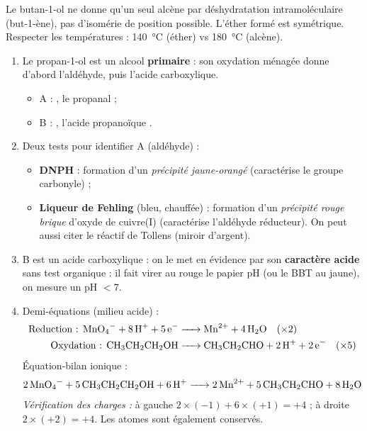 \documentclass[11pt]{article}
\newcommand{\cle}[1]{{\popxbold\color{popdark}#1}}
\begin{document}
\begin{attention}
Le butan-1-ol ne donne qu'un seul alcène par déshydratation intramoléculaire (but-1-ène), pas d'isomérie de position possible. L'éther formé est symétrique. Respecter les températures : \SI{140}{\celsius} (éther) vs \SI{180}{\celsius} (alcène).
\end{attention}

\begin{corrige}
\begin{enumerate}
  \item Le propan-1-ol est un alcool \textbf{primaire} : son oxydation ménagée donne d'abord l'aldéhyde, puis l'acide carboxylique.
  \begin{itemize}
    \item A : , le \cle{propanal}  ;
    \item B : , l'\cle{acide propanoïque} .
  \end{itemize}
  \item Deux tests pour identifier A (aldéhyde) :
  \begin{itemize}
    \item \textbf{DNPH} : formation d'un \emph{précipité jaune-orangé} (caractérise le groupe carbonyle) ;
    \item \textbf{Liqueur de Fehling} (bleu, chauffée) : formation d'un \emph{précipité rouge brique} d'oxyde de cuivre(I)  (caractérise l'aldéhyde réducteur). On peut aussi citer le réactif de Tollens (miroir d'argent).
  \end{itemize}
  \item B est un acide carboxylique : on le met en évidence par son \textbf{caractère acide} sans test organique : il fait virer au rouge le papier pH (ou le BBT au jaune), on mesure un pH $< 7$.
  \item Demi-équations (milieu acide) :
  \begin{align*}
    \text{Reduction : } \ce{MnO4- + 8 H+ + 5 e- &-> Mn^2+ + 4 H2O} \quad (\times 2)\\
    \text{Oxydation : } \ce{CH3CH2CH2OH &-> CH3CH2CHO + 2 H+ + 2 e-} \quad (\times 5)
  \end{align*}
  Équation-bilan ionique :
  \[ \ce{2 MnO4- + 5 CH3CH2CH2OH + 6 H+ -> 2 Mn^2+ + 5 CH3CH2CHO + 8 H2O} \]
  \emph{Vérification des charges :} à gauche $2\times(-1)+6\times(+1)=+4$ ; à droite $2\times(+2)=+4$. Les atomes sont également conservés.
\end{enumerate}
\end{corrige}
\end{document}
